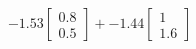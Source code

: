 \documentclass[preview]{standalone}
\begin{document}
\begin{align*}
-1.53 \begin{bmatrix} 0.8 \\ 0.5 \end{bmatrix} + -1.44 \begin{bmatrix} 1 \\ 1.6 \end{bmatrix}
\end{align*}
\end{document}

